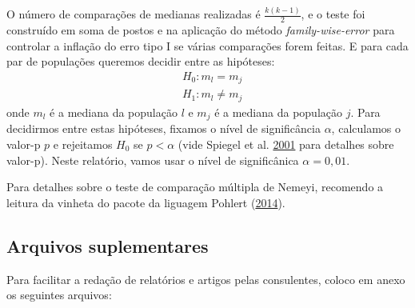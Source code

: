 \documentclass[]{article}
\begin{document}
O número de comparações de medianas realizadas é \(\frac{k(k-1)}{2}\), e o teste foi construído em soma de postos e na aplicação do método \emph{family-wise-error} para controlar a inflação do erro tipo I se várias comparações forem feitas. E para cada par de populações queremos decidir entre as hipóteses:
\[
\begin{split}
&H_0: m_l = m_j\\
&H_1: m_l \neq m_j
\end{split}
\]
onde \(m_l\) é a mediana da população \(l\) e \(m_j\) é a mediana da população \(j\). Para decidirmos entre estas hipóteses, fixamos o nível de significância \(\alpha\), calculamos o valor-p \(p\) e rejeitamos \(H_0\) se \(p < \alpha\) (vide Spiegel et al. \protect\hyperlink{ref-spiegel2001probability}{2001} para detalhes sobre valor-p). Neste relatório, vamos usar o nível de significânica \(\alpha=0,01\).

Para detalhes sobre o teste de comparação múltipla de Nemeyi, recomendo a leitura da vinheta do pacote da liguagem Pohlert (\protect\hyperlink{ref-PMCMR}{2014}).

\hypertarget{arquivos-suplementares}{%
\subsection{Arquivos suplementares}\label{arquivos-suplementares}}

Para facilitar a redação de relatórios e artigos pelas consulentes, coloco em anexo os seguintes arquivos:
\end{document}
